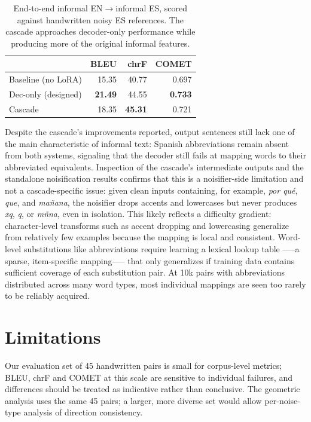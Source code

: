 \documentclass[11pt]{article}
\begin{document}
\begin{table}[t]
  \centering
  \small
  \begin{tabular}{lrrr}
    \toprule
    & \textbf{BLEU} & \textbf{chrF} & \textbf{COMET} \\
    \midrule
      Baseline (no LoRA)        & 15.35 & 40.77 & 0.697 \\
      Dec-only (designed)   & \textbf{21.49} & 44.55 & \textbf{0.733} \\
      Cascade             & 18.35 & \textbf{45.31} & 0.721 \\
    \bottomrule
  \end{tabular}
  \caption{End-to-end informal EN$\rightarrow$informal ES, scored against
    handwritten noisy ES references. The cascade approaches decoder-only
    performance while producing more of the original informal features.}
  \label{tab:cascade}
\end{table}

Despite the cascade's improvements reported, output sentences still lack one of the main characteristic of informal text: Spanish abbreviations remain absent from both systems, signaling that the decoder still fails at mapping words to their abbreviated equivalents. Inspection of the cascade's intermediate outputs and the standalone
noisification results confirms that this is a noisifier-side limitation and
not a cascade-specific issue: given clean inputs containing, for example,
\textit{por qu\'e}, \textit{que}, and \textit{ma\~{n}ana}, the noisifier
drops accents and lowercases but never produces \textit{xq}, \textit{q},
or \textit{m{\~n}na}, even in isolation. This likely reflects a difficulty gradient: character-level transforms such as accent dropping and lowercasing generalize from relatively few examples because the mapping is local and consistent. Word-level substitutions like abbreviations require learning a lexical lookup table —--a sparse, item-specific mapping--— that only generalizes if training data contains sufficient coverage of each substitution pair. At 10k pairs with abbreviations distributed across many word types, most individual mappings are seen too rarely to be reliably acquired.

\section*{Limitations}

Our evaluation set of 45 handwritten pairs is small for corpus-level metrics;
BLEU, chrF and COMET at this scale are sensitive to individual failures, and
differences should be treated as indicative rather than conclusive. The
geometric analysis uses the same 45 pairs; a larger, more diverse set would
allow per-noise-type analysis of direction consistency.
\end{document}
